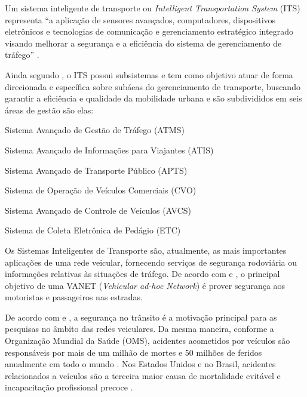 \documentclass[
	12pt,				%
	oneside,			%
	a4paper,			%
	english,			%
	brazil				%
	]{abntex2ppgsi}
\begin{document}
Um sistema inteligente de transporte ou \textit{Intelligent Transportation System} (ITS) representa ``a aplicação de sensores avançados, computadores, dispositivos eletrônicos e tecnologias de comunicação e gerenciamento estratégico integrado visando melhorar a segurança e a eficiência do sistema de gerenciamento de tráfego'' \cite{nasim2012distributed}. 

Ainda segundo , o ITS possui subsistemas e tem como objetivo atuar de forma direcionada e específica sobre subáeas do gerenciamento de transporte, buscando garantir a eficiência e qualidade da mobilidade urbana e são subdivididos em seis áreas de gestão são elas: 

\begin{itemize*}
	\item{Sistema Avançado de Gestão de Tráfego (ATMS)}
	\item{Sistema Avançado de Informações para Viajantes (ATIS)}
	\item{Sistema Avançado de Transporte Público (APTS)}
	\item{Sistema de Operação de Veículos Comerciais (CVO)}
	\item{Sistema Avançado de Controle de Veículos (AVCS)}
	\item{Sistema de Coleta Eletrônica de Pedágio (ETC)}
\end{itemize*}

Os Sistemas Inteligentes de Transporte são, atualmente,  as  mais  importantes  aplicações  de  uma  rede  veicular,  fornecendo  serviços  de segurança  rodoviária \cite{xu2003design}  ou  informações  relativas  às  situações  de  tráfego.  De acordo com   e , o principal objetivo de uma  VANET (\textit{Vehicular ad-hoc Network}) é prover segurança aos motoristas e passageiros nas estradas.

De acordo com  e , a segurança no trânsito é a motivação principal para as pesquisas no âmbito das redes veiculares.  Da mesma maneira, conforme a Organização Mundial da Saúde (OMS), acidentes acometidos por veículos são responsáveis por mais de um milhão de mortes e 50 milhões de feridos anualmente em todo o mundo \cite{peden2004world}. Nos Estados Unidos e no Brasil, acidentes relacionados a veículos são  a terceira maior causa de mortalidade evitável e incapacitação profissional precoce \cite{systematics2011crashes} \cite{el2007systematic}. 
\end{document}
